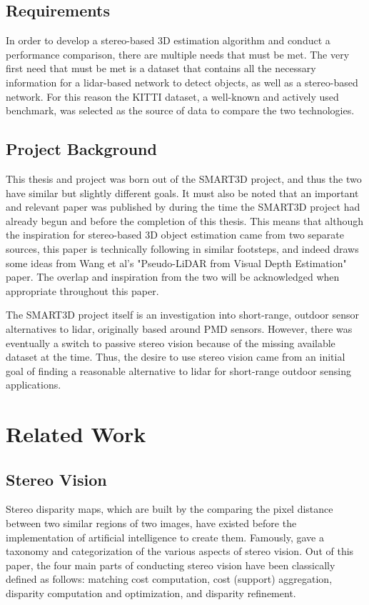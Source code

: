 \subsection{Requirements}
In order to develop a stereo-based 3D estimation algorithm and conduct a performance comparison, there are multiple needs that must be met. The very first need that must be met is a dataset that contains all the necessary information for a lidar-based network to detect objects, as well as a stereo-based network. For this reason the KITTI dataset, a well-known and actively used benchmark, was selected as the source of data to compare the two technologies.


\subsection{Project Background}
This thesis and project was born out of the SMART3D project, and thus the two have similar but slightly different goals. It must also be noted that an important and relevant paper was published by \cite{wang_pseudo-lidar_2019} during the time the SMART3D project had already begun and before the completion of this thesis. This means that although the inspiration for stereo-based 3D object estimation came from two separate sources, this paper is technically following in similar footsteps, and indeed draws some ideas from Wang et al's "Pseudo-LiDAR from Visual Depth Estimation" paper. The overlap and inspiration from the two will be acknowledged when appropriate throughout this paper. 

The SMART3D project itself is an investigation into short-range, outdoor sensor alternatives to lidar, originally based around PMD sensors. However, there was eventually a switch to passive stereo vision because of the missing available dataset at the time. Thus, the desire to use stereo vision came from an initial goal of finding a reasonable alternative to lidar for short-range outdoor sensing applications. 

\newpage
\section{Related Work} %

\subsection{Stereo Vision}
Stereo disparity maps, which are built by the comparing the pixel distance between two similar regions of two images, have existed before the implementation of artificial intelligence to create them. Famously, \cite{scharstein_taxonomy_2002} gave a taxonomy and categorization of the various aspects of stereo vision. Out of this paper, the four main parts of conducting stereo vision have been classically defined as follows: matching cost computation, cost (support) aggregation, disparity computation and optimization, and disparity refinement. 

